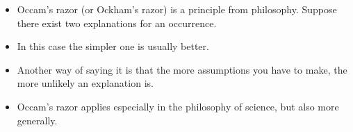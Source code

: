 
\begin{frame}
\begin{itemize}
\item Occam's razor (or Ockham's razor) is a principle from philosophy. Suppose there exist two explanations for an occurrence. \item In this case the simpler one is usually better. 
\item Another way of saying it is that the more assumptions you have to make, the more unlikely an explanation is. 
\item Occam's razor applies especially in the philosophy of science, but also more generally.
\end{itemize}
\end{frame}

